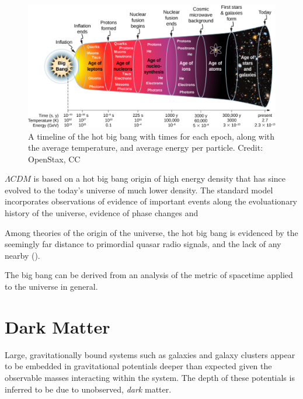 \documentclass{paper}
\begin{document}
  \begin{figure}[!htb]
    \begin{centering}
    \includegraphics[scale=1.0]{Intro-big_bang.pdf}
    \caption{A timeline of the hot big bang with times for each epoch,
      along with the average temperature, and average energy per particle.
    Credit: OpenStax, CC}
    \label{fig:Intro-big_bang}
    \end{centering}
  \end{figure}

  \(\Lambda CDM\) is based on a hot big bang origin of high energy density 
  that has since evolved to the today's universe of much lower density. The 
  standard model incorporates observations of evidence of important events 
  along the evoluationary history of the universe, evidence of phase changes 
  and 

  Among theories of the origin of the universe, the hot big bang is evidenced
  by the seemingly far distance to primordial quasar radio signals, and the
  lack of any nearby (\cite{Condon_1998}). 

  The big bang can be derived from an analysis of the metric of spacetime 
  applied to the universe in general. %


\section{Dark Matter}
  Large, gravitationally bound systems such as galaxies and galaxy clusters 
  appear to be embedded in gravitational potentials deeper than expected given 
  the observable masses interacting within the system. The depth of these 
  potentials is inferred to be due to unobserved, \textit{dark} matter.
\end{document}
